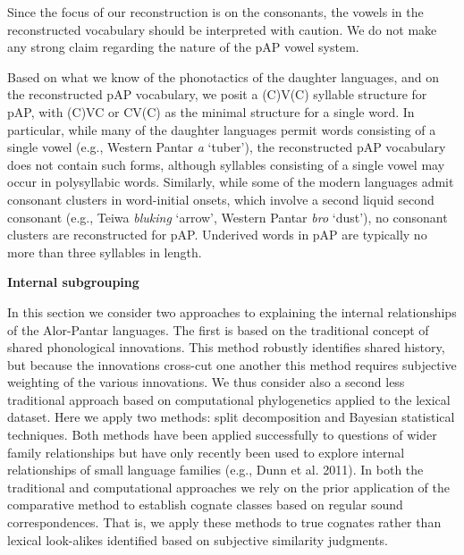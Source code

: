 Since the focus of our reconstruction is on the consonants, the vowels in the reconstructed vocabulary should be interpreted with caution. We do not make any strong claim regarding the nature of the pAP vowel system.

Based on what we know of the phonotactics of the daughter languages, and on the reconstructed pAP vocabulary, we posit a (C)V(C) syllable structure for pAP, with (C)VC or CV(C) as the minimal structure for a single word. In particular, while many of the daughter languages permit words consisting of a single vowel (e.g., Western Pantar \textit{a }{\textquoteleft}tuber{\textquoteright}), the reconstructed pAP vocabulary does not contain such forms, although syllables consisting of a single vowel may occur in polysyllabic words. Similarly, while some of the modern languages admit consonant clusters in word-initial onsets, which involve a second liquid second consonant (e.g., Teiwa \textit{bluking} {\textquoteleft}arrow{\textquoteright}, Western Pantar \textit{bro} {\textquoteleft}dust{\textquoteright}), no consonant clusters are reconstructed for pAP. Underived words in pAP are typically no more than three syllables in length.

{\bfseries
\hypertarget{RefHeading49929871885726}{}Internal subgrouping }

In this section we consider two approaches to explaining the internal relationships of the Alor-Pantar languages. The first is based on the traditional concept of shared phonological innovations. This method robustly identifies shared history, but because the innovations cross-cut one another this method requires subjective weighting of the various innovations. We thus consider also a second less traditional approach based on computational phylogenetics applied to the lexical dataset. Here we apply two methods: split decomposition and Bayesian statistical techniques. Both methods have been applied successfully to questions of wider family relationships but have only recently been used to explore internal relationships of small language families (e.g., Dunn et al. 2011). In both the traditional and computational approaches we rely on the prior application of the comparative method to establish cognate classes based on regular sound correspondences. That is, we apply these methods to true cognates rather than 
lexical look-alikes identified based on subjective similarity judgments.

